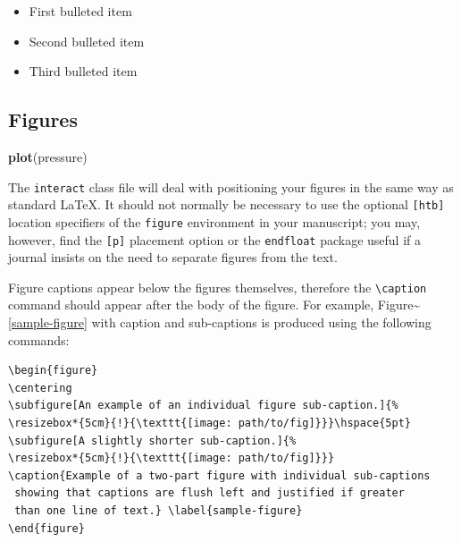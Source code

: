 \documentclass[]{interact}
\theoremstyle{plain}%
\theoremstyle{definition}
\theoremstyle{remark}
\newenvironment{Shaded}{\begin{snugshade}}{\end{snugshade}}
\newcommand{\FunctionTok}[1]{\textcolor[rgb]{0.13,0.29,0.53}{\textbf{#1}}}
\newcommand{\NormalTok}[1]{#1}
\providecommand{\tightlist}{%
  \setlength{\itemsep}{0pt}\setlength{\parskip}{0pt}}
\def\tightlist{}
\begin{document}
\begin{itemize}
\tightlist
\item
  First bulleted item
\item
  Second bulleted item
\item
  Third bulleted item
\end{itemize}

\hypertarget{figures}{%
\subsection{Figures}\label{figures}}

\begin{Shaded}
\begin{Highlighting}[]
\FunctionTok{plot}\NormalTok{(pressure)}
\end{Highlighting}
\end{Shaded}

The \texttt{interact} class file will deal with positioning your figures
in the same way as standard \LaTeX. It should not normally be necessary
to use the optional \texttt{{[}htb{]}} location specifiers of the
\texttt{figure} environment in your manuscript; you may, however, find
the \texttt{{[}p{]}} placement option or the \texttt{endfloat} package
useful if a journal insists on the need to separate figures from the
text.

Figure captions appear below the figures themselves, therefore the
\texttt{\textbackslash{}caption} command should appear after the body of
the figure. For example, Figure\textasciitilde{}\ref{sample-figure} with
caption and sub-captions is produced using the following commands:

\begin{verbatim}
\begin{figure}
\centering
\subfigure[An example of an individual figure sub-caption.]{%
\resizebox*{5cm}{!}{\texttt{[image: path/to/fig]}}}\hspace{5pt}
\subfigure[A slightly shorter sub-caption.]{%
\resizebox*{5cm}{!}{\texttt{[image: path/to/fig]}}}
\caption{Example of a two-part figure with individual sub-captions
 showing that captions are flush left and justified if greater
 than one line of text.} \label{sample-figure}
\end{figure}
\end{verbatim}
\end{document}

